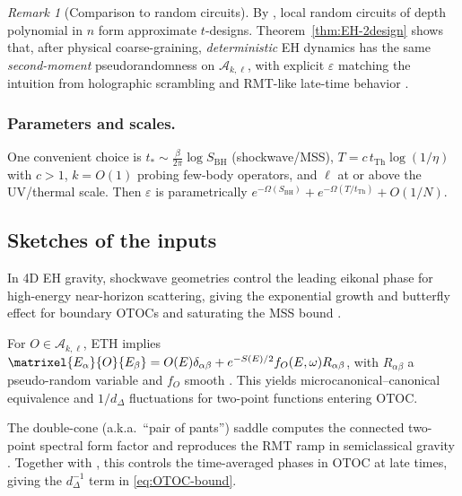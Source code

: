 \documentclass[aps,prd,preprint,onecolumn,superscriptaddress,nofootinbib,longbibliography,floatfix,11pt,showpacs,showkeys]{revtex4-2}
\theoremstyle{plain}
\theoremstyle{definition}
\theoremstyle{remark}
\newtheorem{remark}[theorem]{Remark}
\begin{document}
\begin{remark}[Comparison to random circuits]
By \cite{Brandao:2016}, local random circuits of depth polynomial in $n$ form approximate $t$-designs.  Theorem~\ref{thm:EH-2design} shows that, after physical coarse-graining, {\em deterministic} EH dynamics has the same {\em second-moment} pseudorandomness on $\mathscr{A}_{k,\ell}$, with explicit $\varepsilon$ matching the intuition from holographic scrambling and RMT-like late-time behavior \cite{SaadShenkerStanford2019,Cotler:2017}.
\end{remark}

\subsubsection{Parameters and scales.}  One convenient choice is $t_\ast\sim \frac{\beta}{2\pi}\log S_{\mathrm{BH}}$ (shockwave/MSS), $T=c\, t_{\mathrm{Th}} \log(1/\eta)$ with $c>1$, $k=O(1)$ probing few-body operators, and $\ell$ at or above the UV/thermal scale.  Then $\varepsilon$ is parametrically $e^{-\Omega(S_{\mathrm{BH}})} + e^{-\Omega(T/t_{\mathrm{Th}})} + O(1/N)$.

\subsection*{Sketches of the inputs}
 In 4D EH gravity, shockwave geometries control the leading eikonal phase for high-energy near-horizon scattering, giving the exponential growth and butterfly effect for boundary OTOCs and saturating the MSS bound \cite{Maldacena:2016,ShenkerStanford:2014}.

 For $O\in\mathscr{A}_{k,\ell}$, ETH implies
$\matrixel{E_\alpha}{O}{E_\beta} = O(E)\delta_{\alpha\beta} + e^{-S(E)/2} f_O(E,\omega) R_{\alpha\beta}$, with $R_{\alpha\beta}$ a pseudo-random variable and $f_O$ smooth \cite{DAlessioKafriPolkovnikovRigol2016}.  This yields microcanonical--canonical equivalence and $1/d_\Delta$ fluctuations for two-point functions entering $\mathrm{OTOC}$.

 The double-cone (a.k.a.\ ``pair of pants'') saddle computes the connected two-point spectral form factor and reproduces the RMT ramp in semiclassical gravity \cite{SaadShenkerStanford2019}.  Together with \cite{Cotler:2017}, this controls the time-averaged phases in $\mathrm{OTOC}$ at late times, giving the $d_\Delta^{-1}$ term in \eqref{eq:OTOC-bound}.
\end{document}
